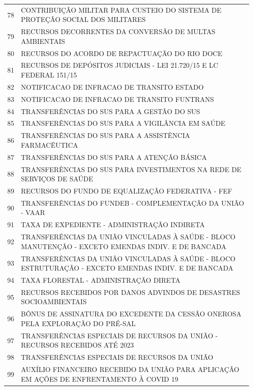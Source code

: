 \documentclass{article}
\begin{document}
\begin{longtable}[c]{m{1cm}|m{11cm}}
\multicolumn{1}{c|}{ 78 } & CONTRIBUIÇÃO MILITAR PARA CUSTEIO DO SISTEMA DE PROTEÇÃO SOCIAL DOS MILITARES \\
\multicolumn{1}{c|}{ 79 } & RECURSOS DECORRENTES DA CONVERSÃO DE MULTAS AMBIENTAIS \\
\multicolumn{1}{c|}{ 80 } & RECURSOS DO ACORDO DE REPACTUAÇÃO DO RIO DOCE \\
\multicolumn{1}{c|}{ 81 } & RECURSOS DE DEPÓSITOS JUDICIAIS - LEI 21.720/15 E LC FEDERAL 151/15 \\
\multicolumn{1}{c|}{ 82 } & NOTIFICACAO DE INFRACAO DE TRANSITO ESTADO \\
\multicolumn{1}{c|}{ 83 } & NOTIFICACAO DE INFRACAO DE TRANSITO FUNTRANS \\
\multicolumn{1}{c|}{ 84 } & TRANSFERÊNCIAS DO SUS PARA A GESTÃO DO SUS \\
\multicolumn{1}{c|}{ 85 } & TRANSFERÊNCIAS DO SUS PARA A VIGILÂNCIA EM SAÚDE \\
\multicolumn{1}{c|}{ 86 } & TRANSFERÊNCIAS DO SUS PARA A ASSISTÊNCIA FARMACÊUTICA \\
\multicolumn{1}{c|}{ 87 } & TRANSFERÊNCIAS DO SUS PARA A ATENÇÃO BÁSICA \\
\multicolumn{1}{c|}{ 88 } & TRANSFERÊNCIAS DO SUS PARA INVESTIMENTOS NA REDE DE SERVIÇOS DE SAÚDE \\
\multicolumn{1}{c|}{ 89 } & RECURSOS DO FUNDO DE EQUALIZAÇÃO FEDERATIVA - FEF \\
\multicolumn{1}{c|}{ 90 } & TRANSFERÊNCIAS DO FUNDEB - COMPLEMENTAÇÃO DA UNIÃO - VAAR \\
\multicolumn{1}{c|}{ 91 } & TAXA DE EXPEDIENTE - ADMINISTRAÇÃO INDIRETA \\
\multicolumn{1}{c|}{ 92 } & TRANSFERÊNCIAS DA UNIÃO VINCULADAS À SAÚDE - BLOCO MANUTENÇÃO - EXCETO EMENDAS INDIV. E DE BANCADA \\
\multicolumn{1}{c|}{ 93 } & TRANSFERÊNCIAS DA UNIÃO VINCULADAS À SAÚDE - BLOCO ESTRUTURAÇÃO - EXCETO EMENDAS INDIV. E DE BANCADA \\
\multicolumn{1}{c|}{ 94 } & TAXA FLORESTAL - ADMINISTRAÇÃO DIRETA \\
\multicolumn{1}{c|}{ 95 } & RECURSOS RECEBIDOS POR DANOS ADVINDOS DE DESASTRES SOCIOAMBIENTAIS \\
\multicolumn{1}{c|}{ 96 } & BÔNUS DE ASSINATURA DO EXCEDENTE DA CESSÃO ONEROSA PELA EXPLORAÇÃO DO PRÉ-SAL \\
\multicolumn{1}{c|}{ 97 } & TRANSFERÊNCIAS ESPECIAIS DE RECURSOS DA UNIÃO - RECURSOS RECEBIDOS ATÉ 2023 \\
\multicolumn{1}{c|}{ 98 } & TRANSFERÊNCIAS ESPECIAIS DE RECURSOS DA UNIÃO \\
\multicolumn{1}{c|}{ 99 } & AUXÍLIO FINANCEIRO RECEBIDO DA UNIÃO PARA APLICAÇÃO EM AÇÕES DE ENFRENTAMENTO À COVID 19 \\
\end{longtable}
\end{document}
